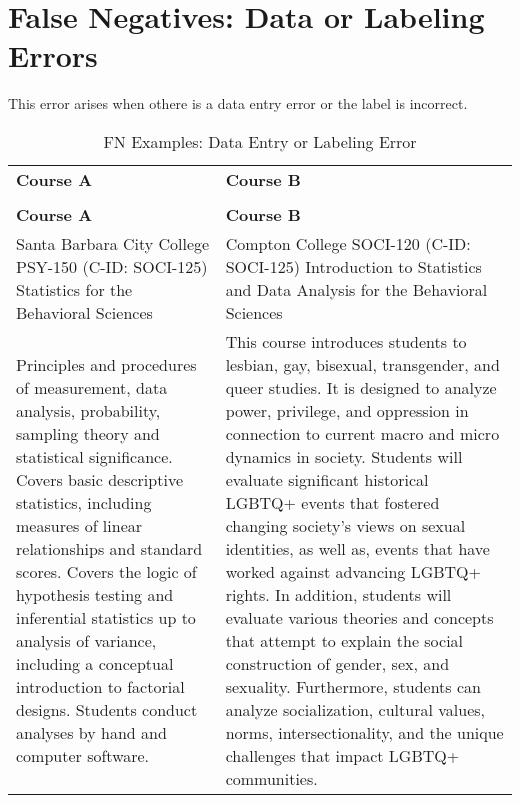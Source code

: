 \section{False Negatives: Data or Labeling Errors}\label{app:labelerror}
This error arises when othere is a data entry error or the label is incorrect.

\begin{longtable}{ >{\baselineskip=12pt}p{}  >{\baselineskip=12pt}p{} }
\captionsetup{skip=5pt}
\caption{FN Examples: Data Entry or Labeling Error}\label{tab:fn_entry}\\
\bottomrule\toprule
\textbf{Course A} & \textbf{Course B} \\
\bottomrule\toprule
\endfirsthead
\caption[]{FN Examples: Data Entry or Labeling Error}\\
\bottomrule\toprule
\textbf{Course A} & \textbf{Course B} \\
\bottomrule\toprule
\endhead
Santa Barbara City College \newline PSY-150 (C-ID: SOCI-125) \newline Statistics for the Behavioral Sciences & Compton College \newline SOCI-120 (C-ID: SOCI-125) \newline Introduction to Statistics and Data Analysis for the Behavioral Sciences \\
\midrule
Principles and procedures of measurement, data analysis, probability, sampling theory and statistical significance. Covers basic descriptive statistics, including measures of linear relationships and standard scores. Covers the logic of hypothesis testing and inferential statistics up to analysis of variance, including a conceptual introduction to factorial designs. Students conduct analyses by hand and computer software. & This course introduces students to lesbian, gay, bisexual, transgender, and queer studies. It is designed to analyze power, privilege, and oppression in connection to current macro and micro dynamics in society. Students will evaluate significant historical LGBTQ+ events that fostered changing society's views on sexual identities, as well as, events that have worked against advancing LGBTQ+ rights. In addition, students will evaluate various theories and concepts that attempt to explain the social construction of gender, sex, and sexuality. Furthermore, students can analyze socialization, cultural values, norms, intersectionality, and the unique challenges that impact LGBTQ+ communities.\\
\bottomrule\toprule
\end{longtable}